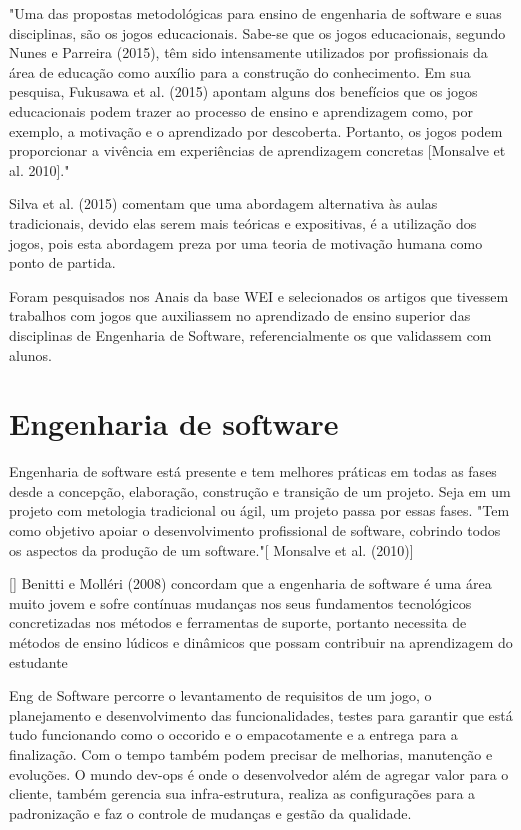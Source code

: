 "Uma das propostas metodológicas para ensino de engenharia de software e suas
disciplinas, são os jogos educacionais. Sabe-se que os jogos educacionais, segundo
Nunes e Parreira (2015), têm sido intensamente utilizados por profissionais da área de
educação como auxílio para a construção do conhecimento. Em sua pesquisa, Fukusawa
et al. (2015) apontam alguns dos benefícios que os jogos educacionais podem trazer ao
processo de ensino e aprendizagem como, por exemplo, a motivação e o aprendizado
por descoberta. Portanto, os jogos podem proporcionar a vivência em experiências de
aprendizagem concretas [Monsalve et al. 2010]." \cite[4]{sucessoJogoEngSoft}

Silva et al. (2015) comentam que uma abordagem alternativa às aulas tradicionais, devido elas
serem mais teóricas e expositivas, é a utilização dos jogos, pois esta abordagem preza
por uma teoria de motivação humana como ponto de partida. \cite{sucessoJogoEngSoft} 

\begin{citacao}
Foram pesquisados nos Anais da base WEI e selecionados os artigos que tivessem trabalhos com jogos que auxiliassem no aprendizado de ensino superior das disciplinas de Engenharia de Software, referencialmente os que validassem com alunos. \cite{sucessoJogoEngSoft}
\end{citacao}


\section[Engenharia de software]{Engenharia de software}
Engenharia de software está presente e tem melhores práticas em todas as fases desde a concepção, elaboração, construção e transição de um projeto. Seja em um projeto com metologia tradicional ou ágil, um projeto passa por essas fases.
"Tem como objetivo apoiar o desenvolvimento profissional de software, cobrindo todos os aspectos da produção de um software."[\cite{sucessoJogoEngSoft}  Monsalve et al. (2010)]

[\cite{sucessoJogoEngSoft}] Benitti e Molléri (2008) concordam que a engenharia de software é uma área muito jovem e sofre contínuas mudanças nos seus fundamentos tecnológicos concretizadas nos métodos e ferramentas de suporte, portanto necessita de métodos de ensino lúdicos e dinâmicos que possam contribuir na aprendizagem do estudante



Eng de Software percorre o levantamento de requisitos de um jogo, o planejamento e desenvolvimento das funcionalidades, testes para garantir que está tudo funcionando como o occorido e o empacotamente e a entrega para a finalização. Com o tempo também podem precisar de melhorias, manutenção e evoluções. O mundo dev-ops é onde o desenvolvedor além de agregar valor para o cliente, também gerencia sua infra-estrutura, realiza as configurações para a padronização e faz o controle de mudanças e gestão da qualidade.




